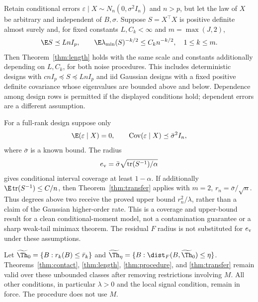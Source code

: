\begin{corollary}\label{cor:design}
Retain conditional errors $\varepsilon\mid X\sim N_n(0,\sigma^2 I_n)$ and $n>p$, but let the law of $X$ be arbitrary and independent of $B,\sigma$. Suppose $S=X^\top X$ is positive definite almost surely and, for fixed constants $L,C_k<\infty$ and $m=\max(J,2)$,
\[
 \E S\preceq LnI_p,\qquad
 \E\lambda_{\min}(S)^{-k/2}\le C_kn^{-k/2},\quad 1\le k\le m.
\]
Then Theorem~\ref{thm:length} holds with the same scale and constants additionally depending on $L,C_k$, for both noise procedures. This includes deterministic designs with $cnI_p\preceq S\preceq LnI_p$ and iid Gaussian designs with a fixed positive definite covariance whose eigenvalues are bounded above and below. Dependence among design rows is permitted if the displayed conditions hold; dependent errors are a different assumption.
\end{corollary}

\begin{proposition}\label{prop:variance}
For a full-rank design suppose only
\[
 \E(\varepsilon\mid X)=0,\qquad
 \operatorname{Cov}(\varepsilon\mid X)\preceq\bar\sigma^2 I_n,
\]
where $\bar\sigma$ is a known bound. The radius
\[
 e_{\rm v}=\bar\sigma\sqrt{\operatorname{tr}(S^{-1})/\alpha}
\]
gives conditional interval coverage at least $1-\alpha$. If additionally $\E\operatorname{tr}(S^{-1})\le C/n$, then Theorem~\ref{thm:transfer} applies with $m=2$, $r_n=\bar\sigma/\sqrt n$. Thus degrees above two receive the proved upper bound $r_n^2/\lambda$, rather than a claim of the Gaussian higher-order rate. This is a coverage and upper-bound result for a clean conditional-moment model, not a contamination guarantee or a sharp weak-tail minimax theorem. The residual $F$ radius is not substituted for $e_{\rm v}$ under these assumptions.
\end{proposition}

\begin{corollary}\label{cor:unbounded}
Let $\widetilde\Th_0=\{B:r_k(B)\le\bar r_k\}$ and $\widetilde\Th_\eta=\{B:\dist_F(B,\widetilde\Th_0)\le\eta\}$. Theorems~\ref{thm:contact}, \ref{thm:length}, \ref{thm:procedure}, and \ref{thm:transfer} remain valid over these unbounded classes after removing restrictions involving $M$. All other conditions, in particular $\lambda>0$ and the local signal condition, remain in force. The procedure does not use $M$.
\end{corollary}

